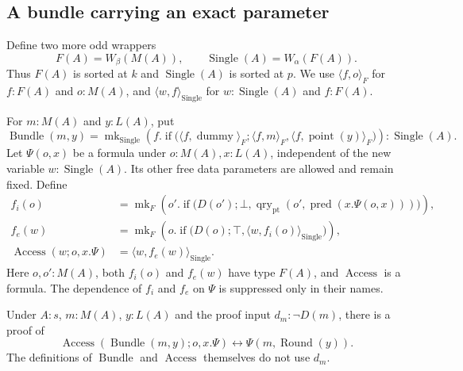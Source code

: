 \subsection{A bundle carrying an exact parameter}

Define two more odd wrappers
\begin{equation}
 F(A)=W_{\beta}(M(A)),\qquad
 \operatorname{Single}(A)=W_{\alpha}(F(A)).
\label{chan-single}
\end{equation}
Thus $F(A)$ is sorted at $k$ and $\operatorname{Single}(A)$ is sorted at
$p$.  We use $\langle f,o\rangle_F$ for $f:F(A)$ and $o:M(A)$, and
$\langle w,f\rangle_{\operatorname{Single}}$ for
$w:\operatorname{Single}(A)$ and $f:F(A)$.

\begin{definition}
\label{chan-bundle-definition}
For $m:M(A)$ and $y:L(A)$, put
\[
 \operatorname{Bundle}(m,y)=\operatorname{mk}_{\operatorname{Single}}
 \left(f.\operatorname{if}\bigl(
    \langle f,\operatorname{dummy}\rangle_F;
    \langle f,m\rangle_F,
    \langle f,\operatorname{point}(y)\rangle_F\bigr)\right)
       :\operatorname{Single}(A).
\]
Let $\Psi(o,x)$ be a formula under $o:M(A),x:L(A)$, independent of the
new variable $w:\operatorname{Single}(A)$.  Its other free data parameters
are allowed and remain fixed.  Define
\begin{equation}
\begin{aligned}
 f_i(o)&=\operatorname{mk}_{F}\left(o'.
    \operatorname{if}\bigl(D(o');\bot,
       \operatorname{qry}_{\operatorname{pt}}
           (o',\operatorname{pred}(x.\Psi(o,x)))\bigr)\right),\\
 f_e(w)&=\operatorname{mk}_{F}\left(o.
    \operatorname{if}\bigl(D(o);\top,
             \langle w,f_i(o)\rangle_{\operatorname{Single}}\bigr)\right),\\
 \operatorname{Access}(w;o,x.\Psi)
     &=\langle w,f_e(w)\rangle_{\operatorname{Single}}.
\end{aligned}
\label{chan-access-definition}
\end{equation}
Here $o,o':M(A)$, both $f_i(o)$ and $f_e(w)$ have type $F(A)$, and
$\operatorname{Access}$ is a formula.  The dependence of $f_i$ and $f_e$
on $\Psi$ is suppressed only in their names.
\end{definition}

\begin{lemma}[Access]
\label{chan-access}
Under $A:s$, $m:M(A)$, $y:L(A)$ and the proof input $d_m:\neg D(m)$,
there is a proof of
\begin{equation}
 \operatorname{Access}(\operatorname{Bundle}(m,y);o,x.\Psi)
        \leftrightarrow\Psi(m,\operatorname{Round}(y)).
\label{chan-access-law}
\end{equation}
The definitions of $\operatorname{Bundle}$ and $\operatorname{Access}$
themselves do not use $d_m$.
\end{lemma}

